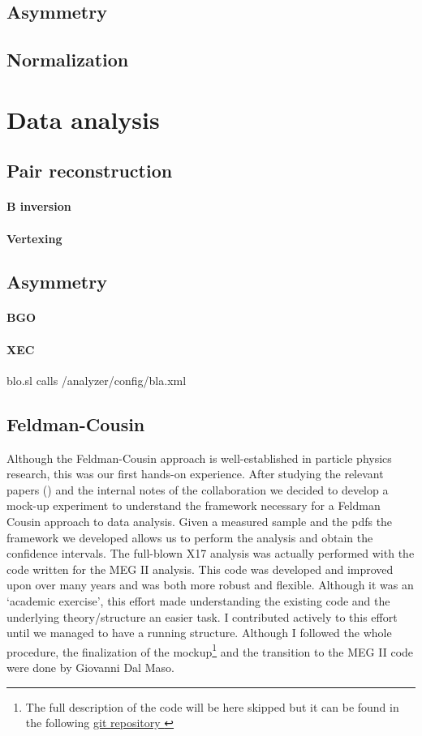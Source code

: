 \begin{refsection}
    \subsection{Asymmetry}
    \subsection{Normalization}
\section{Data analysis}
    \subsection{Pair reconstruction}
        \paragraph{\textbf{B} inversion}
        \paragraph{Vertexing}
    \subsection{Asymmetry}
        \paragraph{BGO}
        \paragraph{XEC}
            blo.sl calls /analyzer/config/bla.xml
    \subsection{Feldman-Cousin}
        Although the Feldman-Cousin approach is well-established in particle physics research, this was our first hands-on experience. 
        After studying the relevant papers (\cite{feldman:1998}\cite{feldman:2011}) and the internal notes of the collaboration we decided to develop a mock-up experiment to understand the framework necessary for a Feldman Cousin approach to data analysis.  
        Given a measured sample and the pdfs the framework we developed allows us to perform the analysis and obtain the confidence intervals.
        The full-blown X17 analysis was actually performed with the code written for the MEG II analysis. This code was developed and improved upon over many years and was both more robust and flexible. 
        Although it was an `academic exercise', this effort made understanding the existing code and the underlying theory/structure an easier task.  
        I contributed actively to this effort until we managed to have a running structure.
        Although I followed the whole procedure, the finalization of the mockup\footnote{ The full description of the code will be here skipped but it can be found in the following 
        \href{https://github.com/gdalmaso96/X17_LL_mock_up}{\underline{git repository \faGithubSquare}}} and the transition to the MEG II code were done by Giovanni Dal Maso.


\end{refsection}
